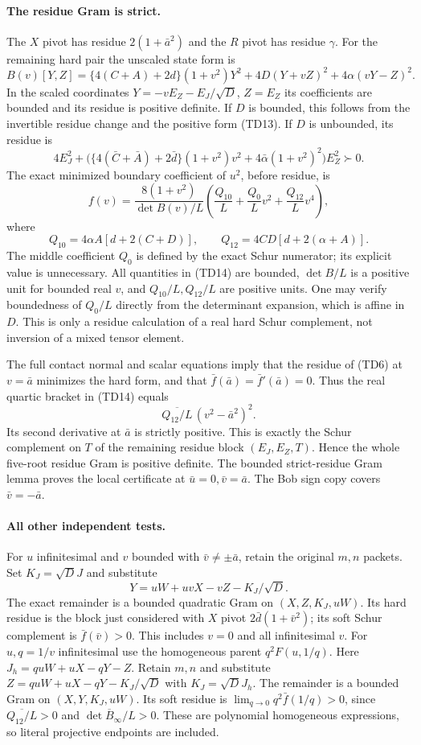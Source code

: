 \paragraph{The residue Gram is strict.}
The $X$ pivot has residue $2(1+\bar a^2)$ and the $R$ pivot has
residue $\gamma$. For the remaining hard pair the unscaled state
form is
\[
 B(v)[Y,Z]=\{4(C+A)+2d\}(1+v^2)Y^2
           +4D(Y+vZ)^2+4\alpha(vY-Z)^2.           \tag{TD13}
\]
In the scaled coordinates $Y=-vE_Z-E_J/\sqrt D$, $Z=E_Z$ its
coefficients are bounded and its residue is positive definite.
If $D$ is bounded, this follows from the invertible residue change
and the positive form (TD13). If $D$ is unbounded, its residue is
\[
 4E_J^2+\bigl(\{4(\bar C+\bar A)+2\bar d\}(1+v^2)v^2
                  +4\bar\alpha(1+v^2)^2\bigr)E_Z^2\succ0.
\]
The exact minimized boundary coefficient of $u^2$, before residue,
is
\[
 f(v)=\frac{8(1+v^2)}{\det B(v)/L}
       \left(\frac{Q_{10}}L+\frac{Q_0}L v^2+\frac{Q_{12}}L v^4\right),
                                                               \tag{TD14}
\]
where
\[
 Q_{10}=4\alpha A[d+2(C+D)],\qquad
 Q_{12}=4CD[d+2(\alpha+A)].
\]
The middle coefficient $Q_0$ is defined by the exact Schur numerator;
its explicit value is unnecessary. All quantities in (TD14) are
bounded, $\det B/L$ is a positive unit for bounded real $v$, and
$Q_{10}/L,Q_{12}/L$ are positive units. One may verify boundedness
of $Q_0/L$ directly from the determinant expansion, which is affine
in $D$. This is only a residue calculation of a real hard Schur
complement, not inversion of a mixed tensor element.

The full contact normal and scalar equations imply that the residue
of (TD6) at $v=\bar a$ minimizes the hard form, and that
$\bar f(\bar a)=\bar f'(\bar a)=0$. Thus the real quartic bracket
in (TD14) equals
\[
 \overline{Q_{12}/L}\,(v^2-\bar a^2)^2.
\]
Its second derivative at $\bar a$ is strictly positive. This is
exactly the Schur complement on $T$ of the remaining residue block
$(E_J,E_Z,T)$. Hence the whole five-root residue Gram is positive
definite. The bounded strict-residue Gram lemma proves the local
certificate at $\bar u=0,\bar v=\bar a$. The Bob sign copy covers
$\bar v=-\bar a$.

\paragraph{All other independent tests.}
For $u$ infinitesimal and $v$ bounded with
$\bar v\ne\pm\bar a$, retain the original $m,n$ packets. Set
$K_J=\sqrt D J$ and substitute
\[
 Y=uW+uvX-vZ-K_J/\sqrt D.
\]
The exact remainder is a bounded quadratic Gram on
$(X,Z,K_J,uW)$. Its hard residue is the block just considered with
$X$ pivot $2\bar d(1+\bar v^2)$; its soft Schur complement is
$\bar f(\bar v)>0$. This includes $v=0$ and all infinitesimal $v$.
For $u,q=1/v$ infinitesimal use the homogeneous parent $q^2F(u,1/q)$.
Here $J_h=quW+uX-qY-Z$. Retain $m,n$ and substitute
$Z=quW+uX-qY-K_J/\sqrt D$ with $K_J=\sqrt D J_h$.
The remainder is a bounded Gram on $(X,Y,K_J,uW)$. Its soft residue
is $\lim_{q\to0}q^2\bar f(1/q)>0$, since
$\overline{Q_{12}/L}>0$ and
$\overline{\det B_\infty/L}>0$.
These are polynomial homogeneous expressions, so literal projective
endpoints are included.


